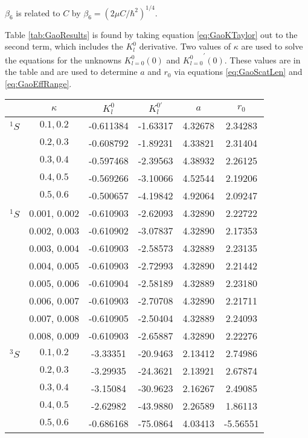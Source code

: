 \documentclass[Dissertation.tex]{subfiles}
\begin{document}
\noindent $\beta_6$ is related to $C$ by $\beta_6 = (2\mu C/\hbar^2)^{1/4}$.

Table \ref{tab:GaoResults} is found by taking equation \ref{eq:GaoKTaylor} out to the second term, which includes the $K_l^0$ derivative. Two values of $\kappa$ are used to solve the equations for the unknowns $K_{l=0}^0(0)$ and ${K_{l=0}^0}^\prime(0)$. These values are in the table and are used to determine $a$ and $r_0$ via equations \ref{eq:GaoScatLen} and \ref{eq:GaoEffRange}.

\begin{table}[H]
\centering
\begin{tabular}{c c c c c c}
\toprule
\toprule
& $\kappa$ & $K_l^0$ & $K_l^{0\prime}$ & $a$ & $r_0$ \\
\midrule
$^1S$ & $0.1, 0.2$ & -0.611384 & -1.63317 & 4.32678 & 2.34283 \\
 & $0.2, 0.3$ & -0.608792 & -1.89231 & 4.33821 & 2.31404 \\
 & $0.3, 0.4$ & -0.597468 & -2.39563 & 4.38932 & 2.26125 \\
 & $0.4, 0.5$ & -0.569266 & -3.10066 & 4.52544 & 2.19206 \\
 & $0.5, 0.6$ & -0.500657 & -4.19842 & 4.92064 & 2.09247 \\
\midrule
$^1S$ & 0.001, 0.002 & -0.610903 & -2.62093 & 4.32890 & 2.22722 \\
 & 0.002, 0.003 & -0.610902 & -3.07837 & 4.32890 & 2.17353 \\
 & 0.003, 0.004 & -0.610903 & -2.58573 & 4.32889 & 2.23135 \\
 & 0.004, 0.005 & -0.610903 & -2.72993 & 4.32890 & 2.21442 \\
 & 0.005, 0.006 & -0.610904 & -2.58189 & 4.32889 & 2.23180 \\
 & 0.006, 0.007 & -0.610903 & -2.70708 & 4.32890 & 2.21711 \\
 & 0.007, 0.008 & -0.610905 & -2.50404 & 4.32889 & 2.24093 \\
 & 0.008, 0.009 & -0.610903 & -2.65887 & 4.32890 & 2.22276 \\
\midrule
\midrule
$^3S$ & $0.1, 0.2$ & -3.33351 & -20.9463 & 2.13412 & 2.74986 \\
 & $0.2, 0.3$ & -3.29935 & -24.3621 & 2.13921 & 2.67874 \\
 & $0.3, 0.4$ & -3.15084 & -30.9623 & 2.16267 & 2.49085 \\
 & $0.4, 0.5$ & -2.62982 & -43.9880 & 2.26589 & 1.86113 \\
 & $0.5, 0.6$ & -0.686168 & -75.0864 & 4.03413 & -5.56551 \\

\end{tabular}
\end{table}
\end{document}
